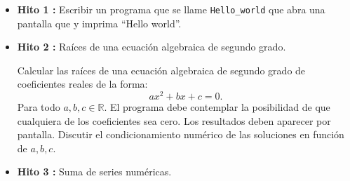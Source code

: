 \documentclass[12pt,spanish]{article}
\begin{document}
\begin{itemize}
	
	
\vspace{1cm}
\item {\bf Hito 1 :}
Escribir un programa que se llame \verb|Hello_world|  que
abra una pantalla que y imprima ``Hello world''. 

%
               
%  
%        
%


\vspace{1cm}
\item {\bf Hito 2 :}    Raíces de una ecuación algebraica de segundo grado. 

Calcular las raíces de una ecuación algebraica de segundo grado
de coeficientes reales de la forma: 
\begin{equation} 
a x^2 + b x + c = 0.
\label{ecuacion_segundo_grado}
\end{equation} 
Para todo  $a, b, c \in \mathbb{R}$.
El programa debe contemplar la posibilidad de que cualquiera de los coeficientes
sea cero. Los resultados deben aparecer por pantalla. Discutir el 
condicionamiento numérico de las soluciones en función de $a, b, c $. 
 


\item {\bf Hito 3 :}    Suma de series numéricas.                                                                              


\end{itemize}
\end{document}
